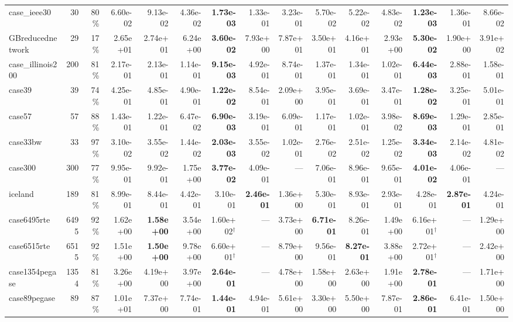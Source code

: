 \documentclass[10pt]{article}
\begin{document}
\begin{landscape}
\begin{table}[H]
\begin{tabular}{lrr rrrrrr rrrrrr}
case\_ieee30 & 30 & 80\% & 6.60e-02 & 9.13e-02 & 4.36e-02 & \textbf{1.73e-03} & 1.33e-01 & 3.23e-01 & 5.70e-02 & 5.22e-02 & 4.83e-02 & \textbf{1.23e-03} & 1.36e-01 & 8.66e-02 \\
GBreducednetwork & 29 & 17\% & 2.65e+01 & 2.74e+01 & 6.24e+00 & \textbf{3.60e-02} & 7.93e+00 & 7.87e+01 & 3.50e+01 & 4.16e+01 & 2.93e+00 & \textbf{5.30e-02} & 1.90e+00 & 3.91e+02 \\
case\_illinois200 & 200 & 81\% & 2.17e-01 & 2.13e-01 & 1.14e-01 & \textbf{9.15e-03} & 4.92e-01 & 8.74e-01 & 1.37e-01 & 1.34e-01 & 1.02e-01 & \textbf{6.44e-03} & 2.88e-01 & 1.58e-01 \\
case39 & 39 & 74\% & 4.25e-01 & 4.85e-01 & 4.90e-01 & \textbf{1.22e-02} & 8.54e-01 & 2.09e+00 & 3.95e-01 & 3.69e-01 & 3.47e-01 & \textbf{1.28e-02} & 3.25e-01 & 5.01e-01 \\
case57 & 57 & 88\% & 1.43e-01 & 1.22e-01 & 6.47e-02 & \textbf{6.90e-03} & 3.19e-01 & 6.09e-01 & 1.17e-01 & 1.02e-01 & 3.98e-02 & \textbf{8.69e-03} & 1.29e-01 & 2.85e-01 \\
case33bw & 33 & 97\% & 3.10e-02 & 3.55e-02 & 1.44e-02 & \textbf{2.03e-03} & 3.55e-02 & 1.02e-01 & 2.76e-02 & 2.51e-02 & 1.25e-02 & \textbf{3.34e-03} & 2.14e-02 & 4.81e-02 \\
case300 & 300 & 77\% & 9.95e-01 & 9.92e-01 & 1.75e+00 & \textbf{3.77e-02} & 4.09e-01 & --- & 7.06e-01 & 8.96e-01 & 9.65e-01 & \textbf{4.01e-02} & 4.06e-01 & --- \\
iceland & 189 & 81\% & 8.99e-01 & 8.44e-01 & 4.42e-01 & 3.10e-01 & \textbf{2.46e-01} & 1.36e+00 & 5.30e-01 & 8.93e-01 & 2.93e-01 & 4.28e-01 & \textbf{2.87e-01} & 4.24e-01 \\
case6495rte & 6495 & 92\% & 1.62e+00 & \textbf{1.58e+00} & 3.54e+00 & 1.60e+02$^\dagger$ & --- & 3.73e+00 & \textbf{6.71e-01} & 8.26e-01 & 1.49e+00 & 6.16e+01$^\dagger$ & --- & 1.29e+00 \\
case6515rte & 6515 & 92\% & 1.51e+00 & \textbf{1.50e+00} & 9.78e+00 & 6.60e+01$^\dagger$ & --- & 8.79e+00 & 9.56e-01 & \textbf{8.27e-01} & 3.88e+00 & 2.72e+01$^\dagger$ & --- & 2.42e+00 \\
case1354pegase & 1354 & 81\% & 3.26e+00 & 4.19e+00 & 3.97e+00 & \textbf{2.64e-01} & --- & 4.78e+00 & 1.58e+00 & 2.63e+00 & 1.91e+00 & \textbf{2.78e-01} & --- & 1.71e+00 \\
case89pegase & 89 & 87\% & 1.01e+01 & 7.37e+00 & 7.74e-01 & \textbf{1.44e-01} & 4.94e-01 & 5.61e+00 & 3.30e+00 & 5.50e+00 & 7.87e-01 & \textbf{2.86e-01} & 6.41e-01 & 1.50e+00 \\

\end{tabular}
\end{table}
\end{landscape}
\end{document}
